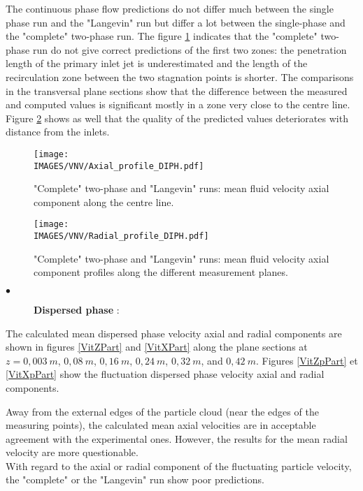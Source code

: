 \noindent

The continuous phase flow predictions do not differ much between the single phase run and the "Langevin" run but differ a lot between the single-phase and the "complete" two-phase run. The figure \ref{AxeFluide_diph} indicates that the "complete" two-phase run do not give correct predictions of the first two zones: the penetration length of the primary inlet jet is underestimated and the length of the recirculation zone between the two stagnation points is shorter. The comparisons in the transversal plane sections show that the difference between the measured and computed values is significant mostly in a zone very close to the centre line. Figure \ref{ProfVZFluide_diph} shows as well that the quality of the predicted values deteriorates with distance from the inlets.

\begin{figure}[H]
   \centerline{\texttt{[image: \\IMAGES/VNV/Axial\_profile\_DIPH.pdf]}}
   \caption{"Complete" two-phase and "Langevin" runs: mean fluid velocity axial component along the centre line.}
   \label{AxeFluide_diph}
\end{figure}

\begin{figure}[H]
   \centerline{\texttt{[image: \\IMAGES/VNV/Radial\_profile\_DIPH.pdf]}}
   \caption{"Complete" two-phase and "Langevin" runs: mean fluid velocity axial component profiles along the different measurement planes.}
   \label{ProfVZFluide_diph}
\end{figure}

\begin{description}
   \item[$\bullet$] \textbf{Dispersed phase} :
\end{description}
\noindent

The calculated mean dispersed phase velocity axial and radial components are shown in figures \ref{VitZPart} and \ref{VitXPart} along the plane sections at $z = 0,003~m$, $0,08~m$, $0,16~m$, $0,24~m$, $0,32~m$, and $0,42~m$.
Figures \ref{VitZpPart} et \ref{VitXpPart} show the fluctuation dispersed phase velocity axial and radial components.

\noindent
Away from the external edges of the particle cloud (near the edges of the measuring points), the calculated mean axial velocities are in acceptable agreement with the experimental ones. However, the results for the mean radial velocity are more questionable. \\ With regard to the axial or radial component of the fluctuating particle velocity, the "complete" or the "Langevin" run show poor predictions.

